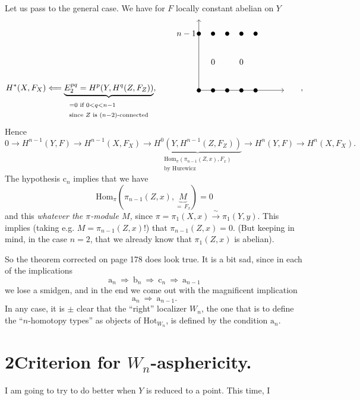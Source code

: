 \documentclass[11pt]{article}
\newcommand{\printedpage}[1]{\marginpar{\footnotesize p.~#1}}
\newcommand{\msp}[1]{\marginpar{\footnotesize [#1]}}
\begin{document}
\printedpage{124}

Let us pass to the general case. We have for $F$ locally constant abelian on $Y$
\[
H^*(X,F_X) \Longleftarrow \underbrace{E_2^{pq} = H^p(Y,H^q(Z,F_Z))}_{\begin{array}{l}\scriptstyle = 0 \text{ if } 0<q<n-1\\ \scriptstyle \text{since } Z \text{ is } (n-2)\text{-connected}\end{array}}, \qquad
\begin{tikzpicture}[baseline=0pt, x=0.6cm, y=0.6cm]
\draw[->] (0,0) -- (0,5);
\draw[->] (0,0) -- (6,0);
\node[left] at (0,4) {$n-1$};
\foreach \i in {0,...,4} { \fill (\i,4) circle (2.5pt); \fill (\i,0) circle (2.5pt); }
\node at (1,2) {$0$};
\node at (3,2) {$0$};
\end{tikzpicture}
\qquad ,
\]
Hence
\[
0 \longrightarrow H^{n-1}(Y,F) \longrightarrow H^{n-1}(X,F_X) \longrightarrow \underbrace{H^0(Y,H^{n-1}(Z,F_Z))}_{\begin{array}{l}\scriptstyle \mathrm{Hom}_\pi(\pi_{n-1}(Z,x),F_x)\\ \scriptstyle \text{by Hurewicz}\end{array}} \longrightarrow H^n(Y,F) \longrightarrow H^n(X,F_X).
\]
The hypothesis $\mathrm{c}_n$ implies that we have
\msp{page 187}
\[
\mathrm{Hom}_\pi(\pi_{n-1}(Z,x),\underbrace{M}_{=\,F_x}) = 0
\]
and this \textit{whatever the $\pi$-module $M$,} since $\pi = \pi_1(X,x) \xrightarrow{\ \sim\ } \pi_1(Y,y)$. This implies (taking e.g. $M = \pi_{n-1}(Z,x)$!) that $\pi_{n-1}(Z,x)=0$. (But keeping in mind, in the case $n=2$, that we already know that $\pi_1(Z,x)$ is abelian).

So the theorem corrected on page 178 does look true. It is a bit sad, since in each of the implications %
\[
\mathrm{a}_n \ \Longrightarrow\ \mathrm{b}_n \ \Longrightarrow\ \mathrm{c}_n \ \Longrightarrow\ \mathrm{a}_{n-1}
\]
we lose a smidgen, and in the end we come out with the magnificent implication
\[
\mathrm{a}_n \ \Longrightarrow\ \mathrm{a}_{n-1}.
\]
In any case, it is $\pm$ clear that the ``right'' localizer $W_n$, the one that is to define the ``$n$-homotopy types'' as objects of $\mathrm{Hot}_{W_n}$, is defined by the condition $\mathrm{a}_n$.

\section*{2\quad Criterion for $W_n$-asphericity.}

I am going to try to do better when $Y$ is reduced to a point. This time, I
\end{document}
